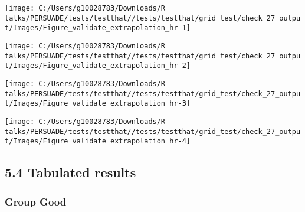 \documentclass[
]{article}
\begin{document}
\begin{flushleft}\texttt{[image: C:/Users/g10028783/Downloads/R talks/PERSUADE/tests/testthat//tests/testthat/grid\_test/check\_27\_output/Images/Figure\_validate\_extrapolation\_hr-1]} \end{flushleft}

\begin{flushleft}\texttt{[image: C:/Users/g10028783/Downloads/R talks/PERSUADE/tests/testthat//tests/testthat/grid\_test/check\_27\_output/Images/Figure\_validate\_extrapolation\_hr-2]} \end{flushleft}

\begin{flushleft}\texttt{[image: C:/Users/g10028783/Downloads/R talks/PERSUADE/tests/testthat//tests/testthat/grid\_test/check\_27\_output/Images/Figure\_validate\_extrapolation\_hr-3]} \end{flushleft}

\begin{flushleft}\texttt{[image: C:/Users/g10028783/Downloads/R talks/PERSUADE/tests/testthat//tests/testthat/grid\_test/check\_27\_output/Images/Figure\_validate\_extrapolation\_hr-4]} \end{flushleft}

\clearpage

\subsection{5.4 Tabulated results}\label{tabulated-results}

\subsubsection{Group Good}\label{group-good}
\end{document}
